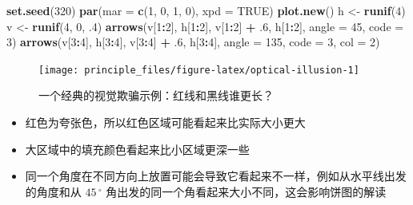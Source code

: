 \documentclass[
  b5paper,
  UTF8,twoside]{book}
\newenvironment{Shaded}{\begin{snugshade}}{\end{snugshade}}
\newcommand{\AttributeTok}[1]{\textcolor[rgb]{0.13,0.29,0.53}{#1}}
\newcommand{\ConstantTok}[1]{\textcolor[rgb]{0.56,0.35,0.01}{#1}}
\newcommand{\DecValTok}[1]{\textcolor[rgb]{0.00,0.00,0.81}{#1}}
\newcommand{\FunctionTok}[1]{\textcolor[rgb]{0.13,0.29,0.53}{\textbf{#1}}}
\newcommand{\NormalTok}[1]{#1}
\newcommand{\OtherTok}[1]{\textcolor[rgb]{0.56,0.35,0.01}{#1}}
\newcommand{\SpecialCharTok}[1]{\textcolor[rgb]{0.81,0.36,0.00}{\textbf{#1}}}
\providecommand{\tightlist}{%
  \setlength{\itemsep}{0pt}\setlength{\parskip}{0pt}}
\begin{document}
\begin{Shaded}
\begin{Highlighting}[]
\FunctionTok{set.seed}\NormalTok{(}\DecValTok{320}\NormalTok{)}
\FunctionTok{par}\NormalTok{(}\AttributeTok{mar =} \FunctionTok{c}\NormalTok{(}\DecValTok{1}\NormalTok{, }\DecValTok{0}\NormalTok{, }\DecValTok{1}\NormalTok{, }\DecValTok{0}\NormalTok{), }\AttributeTok{xpd =} \ConstantTok{TRUE}\NormalTok{)}
\FunctionTok{plot.new}\NormalTok{()}
\NormalTok{h }\OtherTok{\textless{}{-}} \FunctionTok{runif}\NormalTok{(}\DecValTok{4}\NormalTok{)}
\NormalTok{v }\OtherTok{\textless{}{-}} \FunctionTok{runif}\NormalTok{(}\DecValTok{4}\NormalTok{, }\DecValTok{0}\NormalTok{, .}\DecValTok{4}\NormalTok{)}
\FunctionTok{arrows}\NormalTok{(v[}\DecValTok{1}\SpecialCharTok{:}\DecValTok{2}\NormalTok{], h[}\DecValTok{1}\SpecialCharTok{:}\DecValTok{2}\NormalTok{], v[}\DecValTok{1}\SpecialCharTok{:}\DecValTok{2}\NormalTok{] }\SpecialCharTok{+}\NormalTok{ .}\DecValTok{6}\NormalTok{, h[}\DecValTok{1}\SpecialCharTok{:}\DecValTok{2}\NormalTok{], }\AttributeTok{angle =} \DecValTok{45}\NormalTok{, }\AttributeTok{code =} \DecValTok{3}\NormalTok{)}
\FunctionTok{arrows}\NormalTok{(v[}\DecValTok{3}\SpecialCharTok{:}\DecValTok{4}\NormalTok{], h[}\DecValTok{3}\SpecialCharTok{:}\DecValTok{4}\NormalTok{], v[}\DecValTok{3}\SpecialCharTok{:}\DecValTok{4}\NormalTok{] }\SpecialCharTok{+}\NormalTok{ .}\DecValTok{6}\NormalTok{, h[}\DecValTok{3}\SpecialCharTok{:}\DecValTok{4}\NormalTok{], }\AttributeTok{angle =} \DecValTok{135}\NormalTok{, }\AttributeTok{code =} \DecValTok{3}\NormalTok{, }\AttributeTok{col =} \DecValTok{2}\NormalTok{)}
\end{Highlighting}
\end{Shaded}

\begin{figure}

{\centering \texttt{[image: principle\_files/figure-latex/optical-illusion-1]} 

}

\caption[一个经典的视觉欺骗示例]{一个经典的视觉欺骗示例：红线和黑线谁更长？}\label{fig:optical-illusion}
\end{figure}



\begin{itemize}
\tightlist
\item
  红色为夸张色，所以红色区域可能看起来比实际大小更大
\item
  大区域中的填充颜色看起来比小区域更深一些
\item
  同一个角度在不同方向上放置可能会导致它看起来不一样，例如从水平线出发的角度和从 \(45\,^{\circ}\) 角出发的同一个角看起来大小不同，这会影响饼图的解读
\end{itemize}
\end{document}
